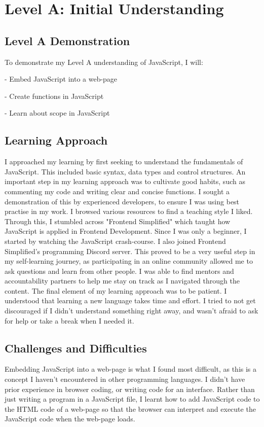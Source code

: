 \documentclass[a4paper, 11pt]{report}
\begin{document}

\tableofcontents



\newpage
\section{Level A: Initial Understanding}
\vspace{5mm}
\subsection{Level A Demonstration}
To demonstrate my Level A understanding of JavaScript, I will:

- Embed JavaScript into a web-page

- Create functions in JavaScript

- Learn about scope in JavaScript


\subsection{Learning Approach}
I approached my learning by first seeking to understand the fundamentals of JavaScript. This included basic syntax, data types and control structures. An important step in my learning approach was to cultivate good habits, such as commenting my code and writing clear and concise functions. I sought a demonstration of this by experienced developers, to ensure I was using best practise in my work. 
I browsed various resources to find a teaching style I liked. Through this, I stumbled across "Frontend Simplified" which taught how JavaScript is applied in Frontend Development. Since I was only a beginner, I started by watching the JavaScript crash-course.
I also joined Frontend Simplified's programming Discord server. This proved to be a very useful step in my self-learning journey, as participating in an online community allowed me to ask questions and learn from other people. I was able to find mentors and accountability partners to help me stay on track as I navigated through the content.
The final element of my learning approach was to be patient. I understood that learning a new language takes time and effort. I tried to not get discouraged if I didn't understand something right away, and wasn't afraid to ask for help or take a break when I needed it.


\subsection{Challenges and Difficulties}
Embedding JavaScript into a web-page is what I found most difficult, as this is a concept I haven't encountered in other programming languages. I didn't have prior experience in browser coding, or writing code for an interface. Rather than just writing a program in a JavaScript file, I learnt how to add JavaScript code to the HTML code of a web-page so that the browser can interpret and execute the JavaScript code when the web-page loads.
\end{document}
